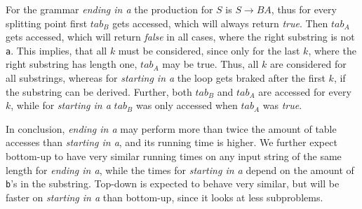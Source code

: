 For the grammar \textit{ending in a} the production for $S$ is $S\rightarrow BA$, thus for every splitting point first $tab_B$ gets accessed, which will always return \textit{true}.
Then $tab_A$ gets accessed, which will return \textit{false} in all cases, where the right substring is not \texttt{a}.
This implies, that all $k$ must be considered, since only for the last $k$, where the right substring has length one, $tab_A$ may be true.
Thus, all $k$ are considered for all substrings, whereas for \textit{starting in a} the loop gets braked after the first $k$, if the substring can be derived.
Further, both $tab_B$ and $tab_A$ are accessed for every $k$, while for \textit{starting in a} $tab_B$ was only accessed when $tab_A$ was \textit{true}.

In conclusion, \textit{ending in a} may perform more than twice the amount of table accesses than \textit{starting in a}, and its running time is higher.
We further expect bottom-up to have very similar running times on any input string of the same length for \textit{ending in a}, while the times for \textit{starting in a} depend on the amount of \texttt{b}'s in the substring.
Top-down is expected to behave very similar, but will be faster on \textit{starting in a} than bottom-up, since it looks at less subproblems.





